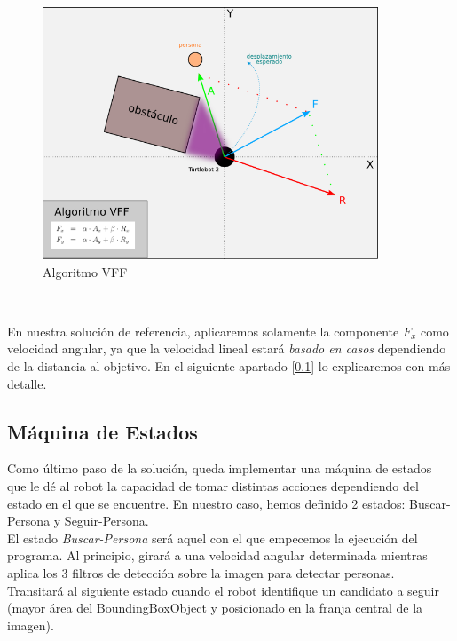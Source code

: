 \begin{figure} [H]
  \begin{center}
    \includegraphics[width=10cm]{imagenes/cap6/esquema-vff.png}
  \end{center}
  \caption[Algoritmo VFF]{Algoritmo VFF}
  \label{fig:esquema_vff}
\end{figure}\

En nuestra solución de referencia, aplicaremos solamente la componente $F_x$ como velocidad angular, ya que la velocidad lineal estará \textit{basado en casos} dependiendo de la distancia al objetivo. En el siguiente apartado [\ref{subsec:maquina_estados}] lo explicaremos con más detalle.\\



\subsection{Máquina de Estados}
\label{subsec:maquina_estados}

Como último paso de la solución, queda implementar una máquina de estados que le dé al robot la capacidad de tomar distintas acciones dependiendo del estado en el que se encuentre. En nuestro caso, hemos definido 2 estados: Buscar-Persona y Seguir-Persona.\\

El estado \textit{Buscar-Persona} será aquel con el que empecemos la ejecución del programa. Al principio, girará a una velocidad angular determinada mientras aplica los 3 filtros de detección sobre la imagen para detectar personas. Transitará al siguiente estado cuando el robot identifique un candidato a seguir (mayor área del BoundingBoxObject y posicionado en la franja central de la imagen).\\

